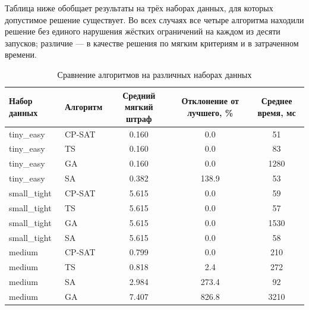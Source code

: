 Таблица ниже обобщает результаты на трёх наборах данных, для которых допустимое решение существует. Во всех случаях все четыре алгоритма находили решение без единого нарушения жёстких ограничений на каждом из десяти запусков; различие — в качестве решения по мягким критериям и в затраченном времени.

\begin{table}[h]
    \centering
    \caption{Сравнение алгоритмов на различных наборах данных}
    \label{tab:algorithm_comparison}

    \begin{tabularx}{\textwidth}{|l|l|c|c|c|}
        \hline
        \textbf{Набор данных} &
        \textbf{Алгоритм} &
        \textbf{Средний мягкий штраф} &
        \textbf{Отклонение от лучшего, \%} &
        \textbf{Среднее время, мс} \\
        \hline

        tiny\_easy   & CP-SAT & 0.160 & 0.0   & 51   \\
        \hline
        tiny\_easy   & TS      & 0.160 & 0.0   & 83   \\
        \hline
        tiny\_easy   & GA      & 0.160 & 0.0   & 1280 \\
        \hline
        tiny\_easy   & SA      & 0.382 & 138.9 & 53   \\
        \hline

        small\_tight & CP-SAT & 5.615 & 0.0   & 59   \\
        \hline
        small\_tight & TS      & 5.615 & 0.0   & 57   \\
        \hline
        small\_tight & GA      & 5.615 & 0.0   & 1530 \\
        \hline
        small\_tight & SA      & 5.615 & 0.0   & 58   \\
        \hline

        medium & CP-SAT & 0.799 & 0.0   & 210  \\
        \hline
        medium & TS      & 0.818 & 2.4   & 272  \\
        \hline
        medium & SA      & 2.984 & 273.4 & 92   \\
        \hline
        medium & GA      & 7.407 & 826.8 & 3210 \\
        \hline

    \end{tabularx}
\end{table}

